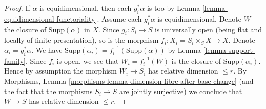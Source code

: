 \documentclass{stacks-project}
\theoremstyle{plain}
\theoremstyle{definition}
\theoremstyle{remark}
\numberwithin{equation}{subsection}
\begin{document}
\begin{proof}
If $\alpha$ is equidimensional, then each $g_i^*\alpha$ is too by
Lemma \ref{lemma-equidimensional-functoriality}. Assume each $g_i^*\alpha$
is equidimensional. Denote $W$ the closure
of $\text{Supp}(\alpha)$ in $X$. Since $g_i : S_i \to S$ is universally open
(being flat and locally of finite presentation), so is the morphism
$f_i : X_i = S_i \times_S X \to X$. Denote $\alpha_i = g_i^*\alpha$. We have
$\text{Supp}(\alpha_i) = f_i^{-1}(\text{Supp}(\alpha))$ by
Lemma \ref{lemma-support-family}.
Since $f_i$ is open, we see that $W_i = f_i^{-1}(W)$ is the closure
of $\text{Supp}(\alpha_i)$. Hence by assumption the morphism
$W_i \to S_i$ has relative dimension $\leq r$.
By Morphisms, Lemma \ref{morphisms-lemma-dimension-fibre-after-base-change}
(and the fact that the morphisms $S_i \to S$ are jointly surjective)
we conclude that $W \to S$ has relative dimension $\leq r$.
\end{proof}
\end{document}
